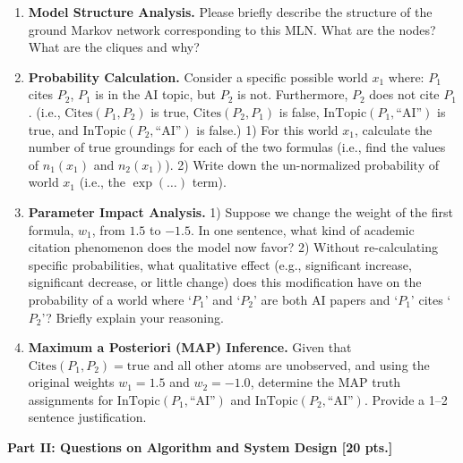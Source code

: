 \documentclass[11pt,a4paper]{article}
\begin{document}
\begin{enumerate}[label=(\alph*)]
    \item \textbf{Model Structure Analysis.} Please briefly describe the structure of the ground Markov network corresponding to this MLN. What are the nodes? What are the cliques and why?
    \item \textbf{Probability Calculation.} Consider a specific possible world $x_1$ where: $P_1$ cites $P_2$, $P_1$ is in the AI topic, but $P_2$ is not. Furthermore, $P_2$ does not cite $P_1$. (i.e., $\mathrm{Cites}(P_1, P_2)$ is true, $\mathrm{Cites}(P_2, P_1)$ is false, $\mathrm{InTopic}(P_1, \text{``AI''})$ is true, and $\mathrm{InTopic}(P_2, \text{``AI''})$ is false.) 1) For this world $x_1$, calculate the number of true groundings for each of the two formulas (i.e., find the values of $n_1(x_1)$ and $n_2(x_1)$). 2) Write down the un-normalized probability of world $x_1$ (i.e., the $\exp(\dots)$ term).
    \item \textbf{Parameter Impact Analysis.} 1) Suppose we change the weight of the first formula, $w_1$, from $1.5$ to $-1.5$. In one sentence, what kind of academic citation phenomenon does the model now favor? 2) Without re-calculating specific probabilities, what qualitative effect (e.g., significant increase, significant decrease, or little change) does this modification have on the probability of a world where `$P_1$' and `$P_2$' are both AI papers and `$P_1$' cites `$P_2$'? Briefly explain your reasoning.
    \item \textbf{Maximum a Posteriori (MAP) Inference.} Given that $\mathrm{Cites}(P_1, P_2) = \mathrm{true}$ and all other atoms are unobserved, and using the original weights $w_1 = 1.5$ and $w_2 = -1.0$, determine the MAP truth assignments for $\mathrm{InTopic}(P_1, \text{``AI''})$ and $\mathrm{InTopic}(P_2, \text{``AI''})$. Provide a 1--2 sentence justification.
\end{enumerate}

\noindent\textbf{Part II: Questions on Algorithm and System Design [20 pts.]}
\end{document}
